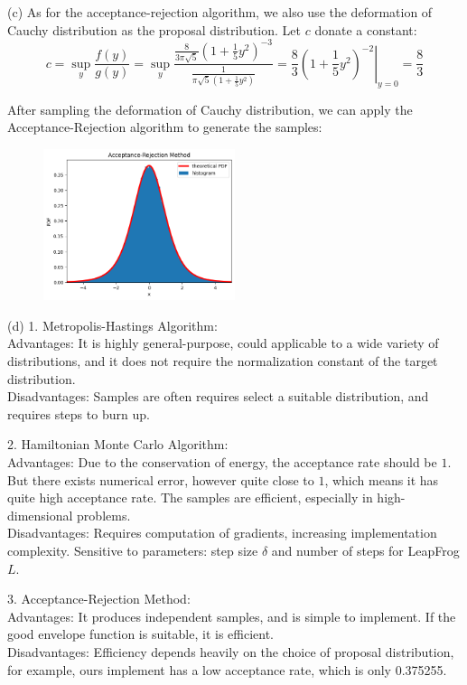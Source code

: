 \begin{homeworkProblem}
(c) As for the acceptance-rejection algorithm, we also use the deformation of Cauchy distribution as the proposal distribution. Let $c$ donate a constant:
$$c = \sup_y\dfrac{f(y)}{g(y)} = \sup_y\dfrac{\frac{8}{3\pi\sqrt{5}}\left(1+\frac{1}{5}y^2\right)^{-3}}{\frac{1}{\pi\sqrt{5}(1+\frac{1}{5}y^2)}}=\dfrac{8}{3}\left.\left(1+\frac{1}{5}y^2\right)^{-2}\right|_{y=0}=\dfrac{8}{3}$$

After sampling the deformation of Cauchy distribution, we can apply the Acceptance-Rejection algorithm to generate the samples: \\
\begin{figure}[htbp]
    \centering
    \includegraphics[width=0.5\textwidth]{./figure/p10/accept_reject.png}
\end{figure}

(d) 1. Metropolis-Hastings Algorithm: \\
Advantages: It is highly general-purpose, could applicable to a wide variety of distributions, and it does not require the normalization constant of the target distribution. \\
Disadvantages: Samples are often requires select a suitable distribution, and requires steps to burn up.

2. Hamiltonian Monte Carlo Algorithm: \\
Advantages: Due to the conservation of energy, the acceptance rate should be $1$. But there exists numerical error, however quite close to $1$, which means it has quite high acceptance rate. The samples are efficient, especially in high-dimensional problems. \\
Disadvantages: Requires computation of gradients, increasing implementation complexity. Sensitive to parameters: step size $\delta$ and number of steps for LeapFrog $L$.

3. Acceptance-Rejection Method: \\
Advantages: It produces independent samples, and is simple to implement. If the good envelope function is suitable, it is efficient. \\
Disadvantages: Efficiency depends heavily on the choice of proposal distribution, for example, ours implement has a low acceptance rate, which is only 0.375255.

\end{homeworkProblem}

\newpage
